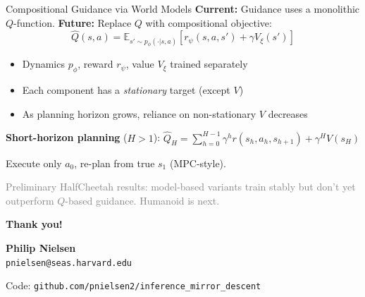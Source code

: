 \documentclass[aspectratio=169,11pt]{beamer}
\newcommand{\E}{\mathbb{E}}
\begin{document}
\begin{frame}{Compositional Guidance via World Models}
\textbf{Current:} Guidance uses a monolithic $Q$-function. \quad
\textbf{Future:} Replace $Q$ with compositional objective:
\vspace{-0.1cm}
\[
  \hat{Q}(s,a) = \E_{s' \sim p_\phi(\cdot|s,a)}\!\left[r_\psi(s,a,s') + \gamma V_\xi(s')\right]
\]
\vspace{-0.4cm}

\pause
\begin{itemize}\setlength\itemsep{2pt}
  \item Dynamics $p_\phi$, reward $r_\psi$, value $V_\xi$ trained separately
  \item Each component has a \emph{stationary} target (except $V$)
  \item As planning horizon grows, reliance on non-stationary $V$ decreases
\end{itemize}

\pause
\smallskip
\textbf{Short-horizon planning} ($H > 1$): \; $\hat{Q}_H = \sum_{h=0}^{H-1} \gamma^h r(s_h, a_h, s_{h+1}) + \gamma^H V(s_H)$

Execute only $a_0$, re-plan from true $s_1$ (MPC-style).

\pause
\smallskip
\textcolor{gray}{\small Preliminary HalfCheetah results: model-based variants train stably but don't yet outperform $Q$-based guidance. Humanoid is next.}
\end{frame}

\begin{frame}{}
\begin{center}
\vspace{2cm}
{\Large\textcolor{accent}{\textbf{Thank you!}}}

\vspace{1cm}
\textbf{Philip Nielsen}\\
\texttt{pnielsen@seas.harvard.edu}

\vspace{0.5cm}
\small Code: \texttt{github.com/pnielsen2/inference\_mirror\_descent}
\end{center}
\end{frame}
\end{document}
